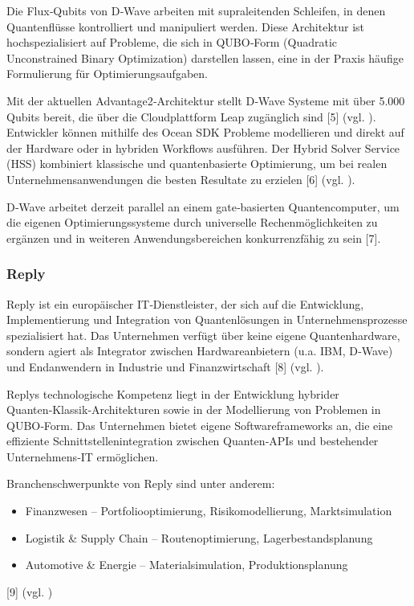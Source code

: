 Die Flux‑Qubits von D‑Wave arbeiten mit supraleitenden Schleifen, in denen Quantenflüsse kontrolliert und manipuliert werden.
Diese Architektur ist hochspezialisiert auf Probleme, die sich in QUBO‑Form (Quadratic Unconstrained Binary Optimization) darstellen lassen, eine in der Praxis häufige Formulierung für Optimierungsaufgaben.

Mit der aktuellen Advantage2‑Architektur stellt D‑Wave Systeme mit über 5.000 Qubits bereit, die über die Cloudplattform Leap zugänglich sind [5] (vgl. \cite{brandhofer_benchmarking_20220}).
Entwickler können mithilfe des Ocean SDK Probleme modellieren und direkt auf der Hardware oder in hybriden Workflows ausführen.
Der Hybrid Solver Service (HSS) kombiniert klassische und quantenbasierte Optimierung, um bei realen Unternehmensanwendungen die besten Resultate zu erzielen [6] (vgl. \cite{brandhofer_benchmarking_20220}).

D‑Wave arbeitet derzeit parallel an einem gate‑basierten Quantencomputer, um die eigenen Optimierungssysteme durch universelle Rechenmöglichkeiten zu ergänzen und in weiteren Anwendungsbereichen konkurrenzfähig zu sein [7].

\subsubsection*{Reply}
Reply ist ein europäischer IT‑Dienstleister, der sich auf die Entwicklung, Implementierung und Integration von Quantenlösungen in Unternehmensprozesse spezialisiert hat.
Das Unternehmen verfügt über keine eigene Quantenhardware, sondern agiert als Integrator zwischen Hardwareanbietern (u.a. IBM, D‑Wave) und Endanwendern in Industrie und Finanzwirtschaft [8] (vgl. \cite{brandhofer_benchmarking_20220}).

Replys technologische Kompetenz liegt in der Entwicklung hybrider Quanten‑Klassik‑Architekturen sowie in der Modellierung von Problemen in QUBO‑Form.
Das Unternehmen bietet eigene Softwareframeworks an, die eine effiziente Schnittstellenintegration zwischen Quanten‑APIs und bestehender Unternehmens‑IT ermöglichen.

Branchenschwerpunkte von Reply sind unter anderem:

\begin{itemize}
\item Finanzwesen – Portfoliooptimierung, Risikomodellierung, Marktsimulation
\item Logistik \& Supply Chain – Routenoptimierung, Lagerbestandsplanung
\item Automotive \& Energie – Materialsimulation, Produktionsplanung
\end{itemize}
[9] (vgl. \cite{brandhofer_benchmarking_20220})

